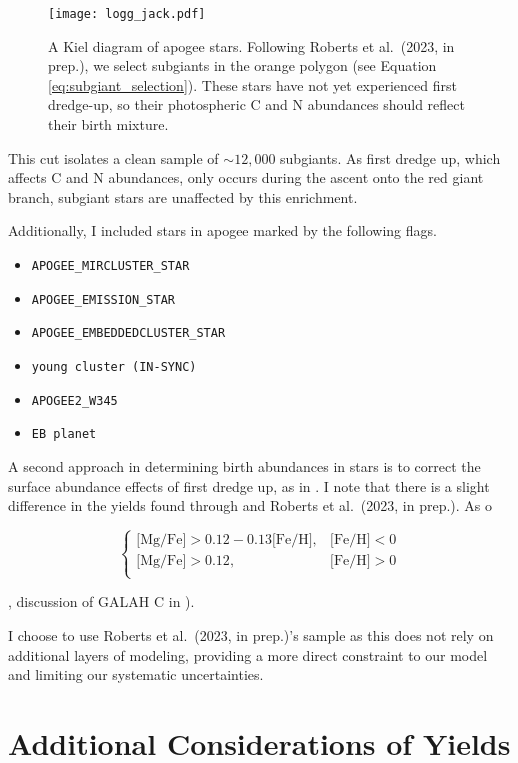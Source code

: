 \documentclass[12pt,oneside,letterpaper]{report}
\newcommand{\apogee}{\gls{apogee}}
\newcommand{\citetjack}{Roberts et al.~(2023, in prep.)}
\newcommand{\about}[1]{${\sim} #1$}
\begin{document}
\begin{figure}
    \centering
    \texttt{[image: logg\_jack.pdf]}
    \caption[Subgiant selection]{
        A Kiel diagram of \apogee{} stars. Following \citetjack, we select subgiants in the orange polygon (see Equation \ref{eq:subgiant_selection}). These stars have not yet experienced first dredge-up, so their photospheric C and N abundances should reflect their birth mixture.
    }
\end{figure}

This cut isolates a clean sample of \about{12,000} subgiants. As first dredge up, which affects C and N abundances, only occurs during the ascent onto the red giant branch, subgiant stars are unaffected by this enrichment. 

Additionally, I included stars in \apogee{} marked by the following flags.
\begin{itemize}
\item \verb|APOGEE_MIRCLUSTER_STAR|
\item \verb|APOGEE_EMISSION_STAR|
\item \verb|APOGEE_EMBEDDEDCLUSTER_STAR|
\item \verb|young cluster (IN-SYNC)|
\item \verb|APOGEE2_W345|
\item \verb|EB planet|
\end{itemize}

A second approach in determining birth abundances in stars is to correct the surface abundance effects of first dredge up, as in \cite{vincenzo+21}. I note that there is a slight difference in the yields found through \cite{vincenzo+21} and \citetjack. As o

\begin{equation}\label{eq:high_alpha}
\begin{cases}
\text{[Mg/Fe]} >0.12-0.13\text{[Fe/H]}, & \text{[Fe/H]}<0\\
\text{[Mg/Fe]} >0.12, & \text{[Fe/H]}>0\\
\end{cases}
\end{equation}

, discussion of GALAH C in \citealt{emily+19}).


I choose to use \citetjack's sample as this does not rely on additional layers of modeling, providing a more direct constraint to our model and limiting our systematic uncertainties.

\newpage
\section{Additional Considerations of Yields}\label{sec:alt_agb}
\end{document}
